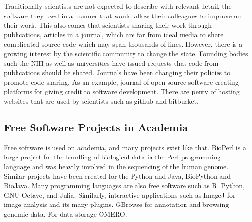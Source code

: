   Traditionally scientists are not expected to describe with
  relevant detail, the software they used in a manner that would allow
  their colleagues to improve on their work.  This also comes that
  scientists sharing their work through publications, articles in a
  journal, which are far from ideal media to share complicated source
  code which may span thousands of lines.  However, there is a growing
  interest by the scientific community to change the state.  Founding
  bodies such the NIH as well as universities have issued requests
  that code from publications should be shared.  Journals have been
  changing their policies to promote code sharing. As an example,
  journal of open source software creating platforms for giving credit
  to software development.  There are penty of hosting websites that
  are used by scientists such as github and bitbucket.

  \subsection{Free Software Projects in Academia}
  Free software is used on academia, and many projects exist like
  that.  BioPerl is a large project for the handling of biological
  data in the Perl programming language and was heavily involved in
  the sequencing of the human genome.  Similar projects have been
  created for the Python and Java, BioPython and BioJava.  Many
  programming languages are also free software such as R, Python, GNU
  Octave, and Julia.  Similarly, interactive applications such as
  ImageJ for image analysis and its many plugins.  GBrowse for
  annotation and browsing genomic data. For data storage OMERO.




